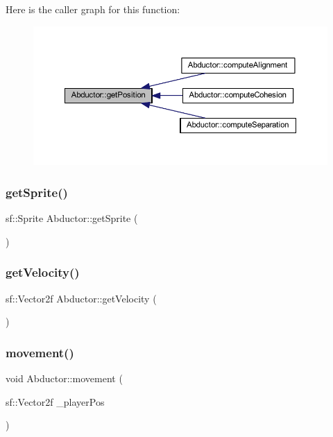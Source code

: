 Here is the caller graph for this function\+:
\nopagebreak
\begin{figure}[H]
\begin{center}
\leavevmode
\includegraphics[width=350pt]{class_abductor_a05b0a89323473488328dafa939e7252a_icgraph}
\end{center}
\end{figure}
\mbox{\label{class_abductor_a604e41fd9403b542c83859027e8c67d4}} 
\subsubsection{\texorpdfstring{get\+Sprite()}{getSprite()}}
{\footnotesize\ttfamily sf\+::\+Sprite Abductor\+::get\+Sprite (\begin{DoxyParamCaption}{ }\end{DoxyParamCaption})}

\mbox{\label{class_abductor_a1f26bdb461e53aa966d744100568d90c}} 
\subsubsection{\texorpdfstring{get\+Velocity()}{getVelocity()}}
{\footnotesize\ttfamily sf\+::\+Vector2f Abductor\+::get\+Velocity (\begin{DoxyParamCaption}{ }\end{DoxyParamCaption})}

\mbox{\label{class_abductor_a378997aa8cccf0b840f9ef8ba2970699}} 
\subsubsection{\texorpdfstring{movement()}{movement()}}
{\footnotesize\ttfamily void Abductor\+::movement (\begin{DoxyParamCaption}\item[{sf\+::\+Vector2f}]{\+\_\+player\+Pos }\end{DoxyParamCaption})}

